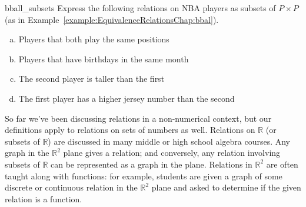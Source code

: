\begin{exercise}{bball_subsets}
Express the following relations on NBA players as subsets of $P \times P$ (as in Example~\ref{example:EquivalenceRelationsChap:bbal}).
\begin{enumerate}[(a)]
\item 
Players that both play the same positions
\item
Players that have birthdays in the same month
\item
The second player is taller than the first
\item
The first player has a higher jersey number than the second
\end{enumerate}
\end{exercise}

So far we've been discussing relations in a non-numerical context, but our definitions apply to relations on sets of numbers as well.  Relations on $\mathbb{R}$ (or subsets of $\mathbb{R}$)  are discussed in many middle or high school algebra courses. Any graph in the $\mathbb{R}^2$ plane gives a relation; and conversely, any relation involving subsets of $\mathbb{R}$ can be represented as a graph in the plane. Relations in $\mathbb{R}^2$ are often taught along with functions: for example, students are given a graph of some discrete or continuous relation in the $\mathbb{R}^2$ plane and asked to determine if the given relation is a function.

